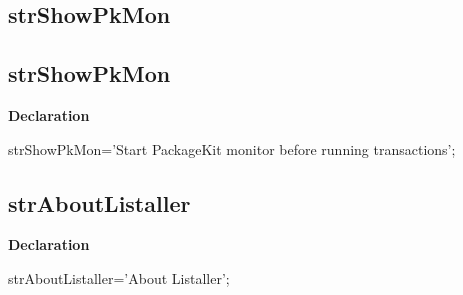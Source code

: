 \documentclass{report}
\newif\ifpdf
\begin{document}
\subsection*{\large{\textbf{strShowPkMon}}\normalsize\hspace{1ex}\hrulefill}
\else
\subsection*{strShowPkMon}
\fi
\label{trstrings-strShowPkMon}
\begin{list}{}{
\setlength{\itemindent}{0cm}
\setlength{\listparindent}{0cm}
\setlength{\leftmargin}{\evensidemargin}
\addtolength{\leftmargin}{\tmplength}
\settowidth{\labelsep}{X}
\addtolength{\leftmargin}{\labelsep}
\setlength{\labelwidth}{\tmplength}
}
\item[\textbf{Declaration}\hfill]
\ifpdf
\begin{flushleft}
\fi
\begin{ttfamily}
strShowPkMon='Start PackageKit monitor before running transactions';\end{ttfamily}

\ifpdf
\end{flushleft}
\fi

\end{list}
\ifpdf
\subsection*{\large{\textbf{strAboutListaller}}\normalsize\hspace{1ex}\hrulefill}
\else
\subsection*{strAboutListaller}
\fi
\label{trstrings-strAboutListaller}
\begin{list}{}{
\setlength{\itemindent}{0cm}
\setlength{\listparindent}{0cm}
\setlength{\leftmargin}{\evensidemargin}
\addtolength{\leftmargin}{\tmplength}
\settowidth{\labelsep}{X}
\addtolength{\leftmargin}{\labelsep}
\setlength{\labelwidth}{\tmplength}
}
\item[\textbf{Declaration}\hfill]
\ifpdf
\begin{flushleft}
\fi
\begin{ttfamily}
strAboutListaller='About Listaller';\end{ttfamily}

\ifpdf
\end{flushleft}
\fi

\end{list}
\ifpdf
\end{document}
